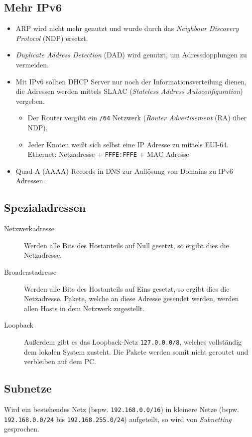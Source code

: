 		\subsection{Mehr IPv6} %
			\begin{itemize}
				\item ARP wird nicht mehr genutzt und wurde durch das \textit{Neighbour Discovery Protocol} (NDP) ersetzt.
				\item \textit{Duplicate Address Detection} (DAD) wird genutzt, um Adressdopplungen zu vermeiden.
				\item Mit IPv6 sollten DHCP Server nur noch der Informationsverteilung dienen, die Adressen werden mittels SLAAC (\textit{Stateless Address Autoconfiguration}) vergeben.
					\begin{itemize}
						\item Der Router vergibt ein \texttt{/64} Netzwerk (\textit{Router Advertisement} (RA) über NDP).
						\item Jeder Knoten weißt sich selbst eine IP Adresse zu mittels EUI-64. \\ Ethernet: Netzadresse + \texttt{FFFE:FFFE} + MAC Adresse
					\end{itemize}
				\item Quad-A (AAAA) Records in DNS zur Auflösung von Domains zu IPv6 Adressen.
			\end{itemize}

	\subsection{Spezialadressen}
		\begin{description}
			\item[Netzwerkadresse] Werden alle Bits des Hostanteils auf Null gesetzt, so ergibt dies die Netzadresse.
			\item[Broadcastadresse] Werden alle Bits des Hostanteils auf Eins gesetzt, so ergibt dies die Netzadresse. Pakete, welche an diese Adresse gesendet werden, werden allen Hosts in dem Netzwerk zugestellt.
			\item[Loopback] Außerdem gibt es das Loopback-Netz \texttt{127.0.0.0/8}, welches vollständig dem lokalen System zusteht. Die Pakete werden somit nicht geroutet und verbleiben auf dem PC.
		\end{description}

	\subsection{Subnetze}
		Wird ein bestehendes Netz (bspw. \texttt{192.168.0.0/16}) in kleinere Netze (bspw. \texttt{192.168.0.0/24} bis \texttt{192.168.255.0/24}) aufgeteilt, so wird von \textit{Subnetting} gesprochen.


